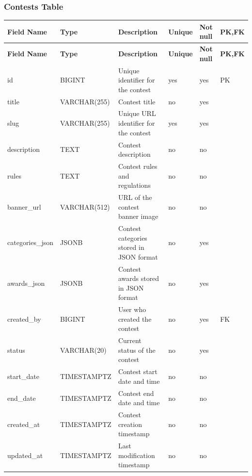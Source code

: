 \vspace{1em}
\subsubsection{Contests Table}
\label{subsubsec:contests-table}

\vspace{0.5em}
\renewcommand{\arraystretch}{1.15}
\setlength{\tabcolsep}{4pt}
\small
\begin{longtable}{|>{\raggedright\arraybackslash}p{}|>{\raggedright\arraybackslash}p{}|>{\raggedright\arraybackslash}p{}|>{\centering\arraybackslash}p{}|>{\centering\arraybackslash}p{}|>{\centering\arraybackslash}p{}|}
\hline
\textbf{Field Name} & \textbf{Type} & \textbf{Description} & \textbf{Unique} & \textbf{Not null} & \textbf{PK,FK} \\
\hline
\endfirsthead
\textbf{Field Name} & \textbf{Type} & \textbf{Description} & \textbf{Unique} & \textbf{Not null} & \textbf{PK,FK} \\
\hline
\endhead
id & BIGINT & Unique identifier for the contest & yes & yes & PK \\
\hline
title & VARCHAR(255) & Contest title & no & yes & \\
\hline
slug & VARCHAR(255) & Unique URL identifier for the contest & yes & yes & \\
\hline
description & TEXT & Contest description & no & no & \\
\hline
rules & TEXT & Contest rules and regulations & no & no & \\
\hline
banner\_url & VARCHAR(512) & URL of the contest banner image & no & no & \\
\hline
categories\_json & JSONB & Contest categories stored in JSON format & no & yes & \\
\hline
awards\_json & JSONB & Contest awards stored in JSON format & no & yes & \\
\hline
created\_by & BIGINT & User who created the contest & no & yes & FK \\
\hline
status & VARCHAR(20) & Current status of the contest & no & yes & \\
\hline
start\_date & TIMESTAMPTZ & Contest start date and time & no & no & \\
\hline
end\_date & TIMESTAMPTZ & Contest end date and time & no & no & \\
\hline
created\_at & TIMESTAMPTZ & Contest creation timestamp & no & no & \\
\hline
updated\_at & TIMESTAMPTZ & Last modification timestamp & no & no & \\
\hline
\end{longtable}

